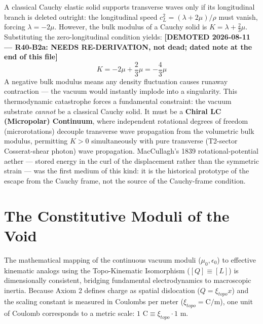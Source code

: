 A classical Cauchy elastic solid supports transverse waves only if its longitudinal branch is deleted outright: the longitudinal speed $c_L^2 = (\lambda + 2\mu)/\rho$ must vanish, forcing $\lambda = -2\mu$. However, the bulk modulus of a Cauchy solid is $K = \lambda + \frac{2}{3}\mu$. Substituting the zero-longitudinal condition yields: \textbf{[DEMOTED 2026-08-11 --- R40-B2a: NEEDS RE-DERIVATION, not dead; dated note at the end of this file]}
\begin{equation}
    K = -2\mu + \frac{2}{3}\mu = -\frac{4}{3}\mu
\end{equation}
A negative bulk modulus means any density fluctuation causes runaway contraction --- the vacuum would instantly implode into a singularity. This thermodynamic catastrophe forces a fundamental constraint: the vacuum substrate \textit{cannot} be a classical Cauchy solid. It must be a \textbf{Chiral LC (Micropolar) Continuum}, where independent rotational degrees of freedom (microrotations) decouple transverse wave propagation from the volumetric bulk modulus, permitting $K > 0$ simultaneously with pure transverse (T2-sector Cosserat-shear photon) wave propagation. MacCullagh's 1839 rotational-potential aether --- stored energy in the curl of the displacement rather than the symmetric strain --- was the first medium of this kind: it is the historical prototype of the escape from the Cauchy frame, not the source of the Cauchy-frame condition.

\section{The Constitutive Moduli of the Void}

The mathematical mapping of the continuous vacuum moduli ($\mu_{0},\epsilon_{0}$) to effective kinematic analogs
using the Topo-Kinematic Isomorphism ($[Q]\equiv[L]$) is dimensionally consistent, bridging fundamental electrodynamics to macroscopic inertia. Because Axiom 2 defines charge
as spatial dislocation ($Q=\xi_{topo}x$) and the scaling constant is measured in Coulombs
per meter ($\xi_{topo}=\text{C/m}$), one unit of Coulomb corresponds to a metric
scale: $1 \text{ C} \equiv \xi_{topo} \cdot 1 \text{ m}$.

